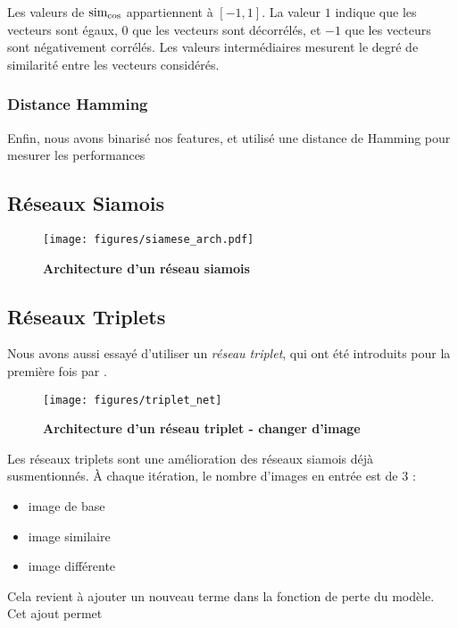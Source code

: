 Les valeurs de $\operatorname*{sim_{cos}}$ appartiennent à $\left[-1, 1\right]$. La valeur $1$ indique que les vecteurs sont égaux, $0$
que les vecteurs sont décorrélés, et $-1$ que les vecteurs sont négativement corrélés. Les valeurs intermédiaires
mesurent le degré de similarité entre les vecteurs considérés.

\subsubsection{Distance Hamming}

Enfin, nous avons binarisé nos features, et utilisé une distance de Hamming pour mesurer les performances

\subsection{R\'eseaux Siamois}
 
\begin{figure}[ht]
    \center
    \texttt{[image: figures/siamese\_arch.pdf]}
    \caption{\label{siamnet_arch} \textbf{Architecture d'un r\'eseau siamois}}
\end{figure}

\subsection{R\'eseaux Triplets}

Nous avons aussi essayé d'utiliser un \textit{réseau triplet}, qui ont été introduits pour la première fois par
\cite{hoffer2014deep}.

\begin{figure}[ht]
    \center
    \texttt{[image: figures/triplet\_net]}
    \caption{\label{siamnet_arch} \textbf{Architecture d'un réseau triplet - changer d'image}
    \cite{hoffer2014deep}}
\end{figure}

Les réseaux triplets sont une amélioration des réseaux siamois déjà susmentionnés. À chaque itération, le nombre
d'images en entrée est de 3 : 

\begin{itemize}
    \item image de base
    \item image similaire
    \item image différente
\end{itemize}

Cela revient à ajouter un nouveau terme dans la fonction de perte du modèle. Cet ajout permet 
